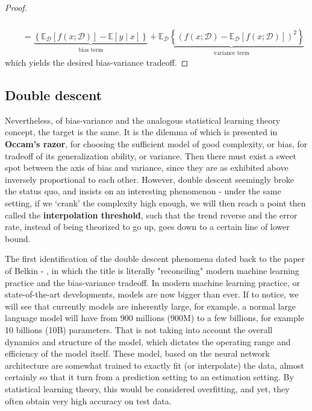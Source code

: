 \begin{proof}
\begin{equation}
\begin{split}
\begin{multlined}
            \end{multlined} \\
            & = \underbrace{\left\{ \mathbb{E}_{\mathcal{D}}[f(x;\mathcal{D})] - \mathbb{E}[y\mid x] \right\}}_{\text{bias term}} + \underbrace{\mathbb{E}_{\mathcal{D}} \left\{(f(x;\mathcal{D})- \mathbb{E}_{\mathcal{D}}[f(x;\mathcal{D})])^{2}\right\}}_{\text{variance term}}
        \end{split}
    \end{equation}
    which yields the desired bias-variance tradeoff. 
\end{proof}

\subsection{Double descent}

Nevertheless, of bias-variance and the analogous statistical learning theory concept, the target is the same. It is the dilemma of which is presented in \textbf{Occam's razor}, for choosing the sufficient model of good complexity, or bias, for tradeoff of its generalization ability, or variance. Then there must exist a sweet spot between the axis of bias and variance, since they are as exhibited above inversely proportional to each other. However, double descent seemingly broke the status quo, and insists on an interesting phenomenon - under the same setting, if we `crank' the complexity high enough, we will then reach a point then called the \textbf{interpolation threshold}, such that the trend reverse and the error rate, instead of being theorized to go up, goes down to a certain line of lower bound. 

The first identification of the double descent phenomena dated back to the paper of Belkin - \cite{belkin_reconciling_2019}, in which the title is literally "reconciling" modern machine learning practice and the bias-variance tradeoff. In modern machine learning practice, or state-of-the-art developments, models are now bigger than ever. If to notice, we will see that currently models are inherently large, for example, a normal large language model will have from 900 millions (900M) to a few billions, for example 10 billions (10B) parameters. That is not taking into account the overall dynamics and structure of the model, which dictates the operating range and efficiency of the model itself. These model, based on the neural network architecture are somewhat trained to exactly fit (or interpolate) the data, almost certainly so that it turn from a prediction setting to an estimation setting. By statistical learning theory, this would be considered overfitting, and yet, they often obtain very high accuracy on test data.

